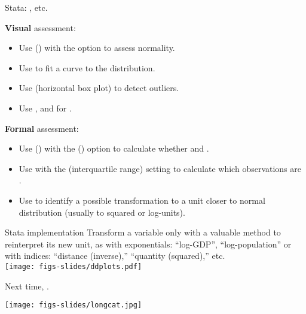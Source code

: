 \documentclass{beamer}
\begin{document}
	\begin{frame}[t]{Stata: ,  etc.}
		
	\textbf{Visual} assessment:
	
		\begin{itemize}
			\item Use  () with the  option to assess normality.

			\item Use  to fit a  curve to the distribution.

			\item Use  (horizontal box plot) to detect outliers.
			\item Use ,  and  for . 
		\end{itemize}

	\textbf{Formal} assessment:		
		\begin{itemize}
			\item Use  () with the  () option to calculate whether  and .
			\item Use  with the  (interquartile range) setting to calculate which observations are .
			\item Use  to identify a possible transformation to a unit closer to normal distribution (usually to squared or log-units).
		\end{itemize}
	
	
	\end{frame}

	
	\begin{frame}[t]{Stata implementation}
	Transform a variable only with a valuable method to reinterpret its new unit, as with exponentials: ``log-GDP'', ``log-population'' or with indices: ``distance (inverse),'' ``quantity (squared),'' etc.\\[1em]
	
	\texttt{[image: figs-slides/ddplots.pdf]}
	
	\end{frame}

	\begin{frame}[t,plain]
			\vspace{.3\paperwidth}
		\begin{center}
			{\Large Next time, .}\\
		\end{center}
			\vspace{1em}
		\begin{flushright}
			\texttt{[image: figs-slides/longcat.jpg]}		
		\end{flushright}

	\end{frame}
	
\end{document}
